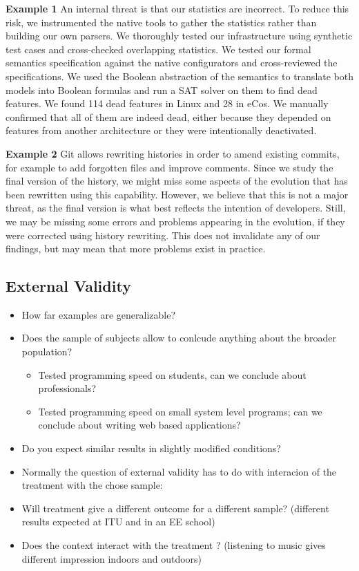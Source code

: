 \textbf{Example 1}
An internal threat is that our statistics are incorrect. To reduce this risk, we instrumented the native tools to gather the statistics rather than building our own parsers. We thoroughly tested our infrastructure using synthetic test cases and cross-checked overlapping statistics. We tested our formal semantics specification against the native configurators and cross-reviewed the specifications. We used the Boolean abstraction of the semantics to translate both models into Boolean formulas and run a SAT solver on them to find dead features. We found 114 dead features in Linux and 28 in eCos. We manually confirmed that all of them are indeed dead, either because they depended on features from another architecture or they were intentionally deactivated.

\textbf{Example 2}
Git allows rewriting histories in order to amend existing commits, for example to add forgotten files and improve comments. Since we study the final version of the history, we might miss some aspects of the evolution that has been rewritten using this capability. However, we believe that this is not a major threat, as the final version is what best reflects the intention of developers. Still, we may be missing some errors and problems appearing in the evolution, if they were corrected using history rewriting. This does not invalidate any of our findings, but may mean that more problems exist in practice.

\subsection{External Validity}
\begin{itemize}
\item How far examples are generalizable?
\item Does the sample of subjects allow to conlcude anything about the broader population?
  \begin{itemize}
  \item Tested programming speed on students, can we conclude about professionals?
  \item Tested programming speed on small system level programs; can we conclude about writing web based applications?
  \end{itemize}
\item Do you expect similar results in slightly modified conditions?
\item Normally the question of external validity has to do with interacion of the treatment with the chose sample:
\item Will treatment give a different outcome for a different sample? (different results expected at ITU and in an EE school)
\item Does the context interact with the treatment ? (listening to music gives different impression indoors and outdoors)
\end{itemize}